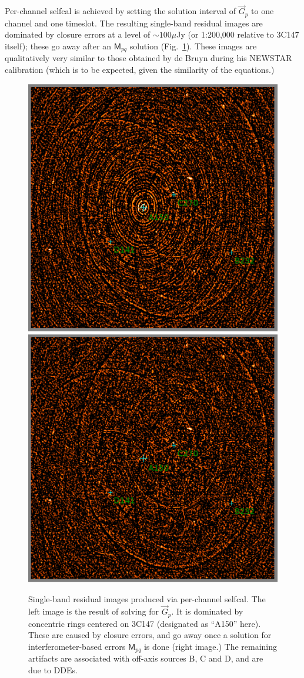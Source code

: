 \documentclass[]{aa}
\newcommand{\jones}[2]{\vec {#1}_{#2}}
\newcommand{\coh}[2]{\mathsf{{#1}}_{{#2}}}
\begin{document}
Per-channel selfcal is achieved by setting the solution interval of $\jones{G}{p}$ to one channel and one timeslot. The resulting single-band residual images are dominated by closure errors at a level of $\sim 100\mu$Jy (or 1:200,000 relative to 3C147 itself); these go away after an $\coh{M}{pq}$ solution (Fig.~\ref{fig:Gsol}). These images are qualitatively very similar to those obtained by de Bruyn during his NEWSTAR calibration (which is to be expected, given the similarity of the equations.)

\begin{figure}
\begin{centering}
\includegraphics[width=.5\columnwidth]{G_solution}%
\includegraphics[width=.5\columnwidth]{IG_solution}\par
\end{centering}
\caption{\label{fig:Gsol}Single-band residual images produced via per-channel selfcal. The left image is the result of solving for $\jones{G}{p}$. It is dominated by concentric rings centered on 3C147 (designated as ``A150'' here). These are caused by closure errors, and go away once a solution for interferometer-based errors $\coh{M}{pq}$ is done (right image.) The remaining artifacts are associated with off-axis sources B, C and D, and are due to DDEs. 
}
\end{figure}
\end{document}
